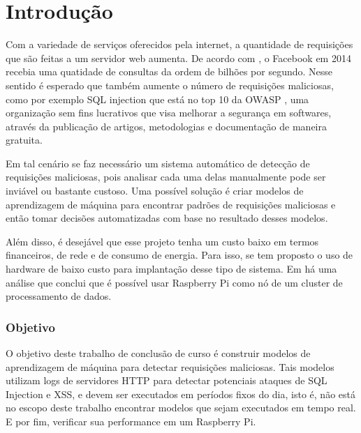 
\chapter{Introdução}
\label{cap:introducao}

Com a variedade de serviços oferecidos pela internet, a quantidade de requisições
que são feitas a um servidor web aumenta. De acordo com \cite{facebook:topProblems}, o Facebook em 2014 recebia
uma quatidade de consultas da ordem de bilhões por segundo. Nesse sentido é esperado que
também aumente o número de requisições maliciosas, como por exemplo SQL injection que está 
no top 10 da OWASP \cite{owasp:top10}, uma organização sem fins lucrativos que visa melhorar a segurança em 
softwares, através da publicação de artigos, metodologias e documentação de maneira gratuita.

Em tal cenário se faz necessário um sistema automático de detecção de requisições maliciosas, pois analisar cada
uma delas manualmente pode ser inviável ou bastante custoso. Uma possível solução é criar modelos de aprendizagem
de máquina para encontrar padrões de requisições maliciosas e então tomar decisões automatizadas com base no
resultado desses modelos.

Além disso, é desejável que esse projeto tenha um custo baixo em termos financeiros, de rede e
de consumo de energia. Para isso, se tem proposto o uso de hardware de baixo custo para implantação 
desse tipo de sistema. Em \cite{sbrc_estendido:lucas} há uma análise que conclui que é possível usar Raspberry Pi como nó de
um cluster de processamento de dados.

\subsection{Objetivo}

O objetivo deste trabalho de conclusão de curso é construir modelos de aprendizagem de máquina para 
detectar requisições maliciosas. Tais modelos utilizam logs de servidores HTTP para detectar 
potenciais ataques de SQL Injection e XSS, e devem ser executados em períodos fixos do dia, isto é, 
não está no escopo deste trabalho encontrar modelos que sejam executados em tempo real. E por fim, 
verificar sua performance em um Raspberry Pi. 

